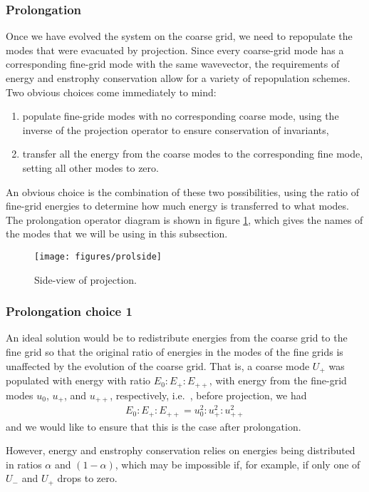 \documentclass[12pt,showpacs,showkeys,%
amsfonts,amsmath,onecolumn,
floatfix,aps,superscriptaddress]{revtex4}
\begin{document}
\subsubsection{Prolongation}
Once we have evolved the system on the coarse grid, we need to
repopulate the modes that were evacuated by projection.  Since every
coarse-grid mode has a corresponding fine-grid mode with the same
wavevector, the requirements of energy and enstrophy conservation
allow for a variety of repopulation schemes.  Two obvious choices come
immediately to mind:
\begin{enumerate}
\item
populate fine-gride modes with no corresponding coarse mode, using the inverse
of the projection operator to ensure conservation of invariants, 
\item
transfer all the energy from the coarse modes to the corresponding fine 
mode, setting all other modes to zero.
\end{enumerate}
An obvious choice is the combination of these two possibilities, using 
the ratio of fine-grid energies to determine how much energy is transferred
to what modes. The prolongation operator diagram is shown in figure 
\ref{prolside}, which gives the names of the modes that we will be using
in this subsection.
\begin{figure}[htb]
  \begin{center}
    \texttt{[image: figures/prolside]}
    \caption{Side-view of projection.}
    \label{prolside}
  \end{center}
\end{figure}

\subsubsection{Prolongation choice 1}
An ideal solution would be to redistribute energies from the coarse grid
to the fine grid so that the original ratio of energies in the modes
of the fine grids is unaffected by the evolution of the coarse grid.
That is, a coarse mode $U_+$ was populated with energy with ratio 
$E_0:E_+:E_{++}$, with energy from the fine-grid modes $u_0$, $u_+$, 
and $u_{++}$, respectively, i.e.\ , before projection, we had
\begin{eqnarray}
  E_0:E_+:E_{++} = u_0^2: u_+^2: u_{++}^2
\end{eqnarray}
and we would like to ensure that this is the case after prolongation. 

However, energy and enstrophy conservation relies on energies being 
distributed in ratios $\alpha$ and $(1-\alpha)$, which may be impossible if,
for example, if only one of $U_-$ and $U_+$ drops to zero.
\end{document}
